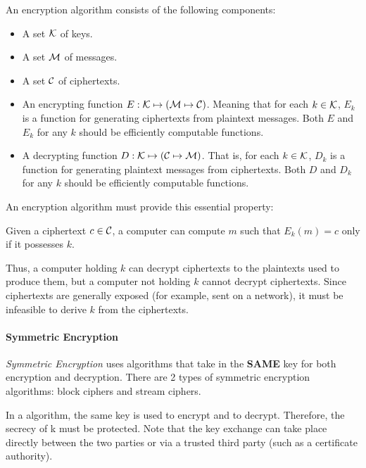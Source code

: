 An encryption algorithm consists of the following components:
\begin{itemize}[noitemsep]
\item A set $\operatorname{\mathcal{K}}$ of keys.
\item A set $\operatorname{\mathcal{M}}$ of messages.
\item A set $\operatorname{\mathcal{C}}$ of ciphertexts.
\item An encrypting function $E : \operatorname{\mathcal{K}} \mapsto (\operatorname{\mathcal{M}} \mapsto \operatorname{\mathcal{C}})$.
  Meaning that for each $k \in \operatorname{\mathcal{K}}$, $E_{k}$ is a function for generating ciphertexts from plaintext messages.
  Both $E$ and $E_{k}$ for any $k$ should be efficiently computable functions.
\item A decrypting function $D : \operatorname{\mathcal{K}} \mapsto (\operatorname{\mathcal{C}} \mapsto \operatorname{\mathcal{M}})$.
  That is, for each $k \in \operatorname{\mathcal{K}}$, $D_{k}$ is a function for generating plaintext messages from ciphertexts.
  Both $D$ and $D_{k}$ for any $k$ should be efficiently computable functions.
\end{itemize}

An encryption algorithm must provide this essential property:
\begin{blackbox}
Given a ciphertext $c \in \operatorname{\mathcal{C}}$, a computer can compute $m$ such that $E_{k}(m) = c$ only if it possesses $k$.
\end{blackbox}

Thus, a computer holding $k$ can decrypt ciphertexts to the plaintexts used to produce them, but a computer not holding $k$ cannot decrypt ciphertexts.
Since ciphertexts are generally exposed (for example, sent on a network), it must be infeasible to derive $k$ from the ciphertexts.

\paragraph{Symmetric Encryption}\label{par:Symmetric_Encryption}
\begin{definition}\label{def:Symmetric_Encryption}
  \emph{Symmetric Encryption} uses algorithms that take in the \textbf{SAME} key for both encryption and decryption.
  There are 2 types of symmetric encryption algorithms: block ciphers and stream ciphers.
\end{definition}

In a  algorithm, the same key is used to encrypt and to decrypt.
Therefore, the secrecy of k must be protected.
Note that the key exchange can take place directly between the two parties or via a trusted third party (such as a certificate authority).

